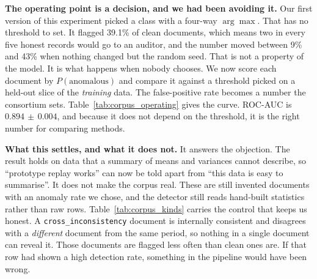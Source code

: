 \documentclass[11pt,a4paper]{article}
\begin{document}
\textbf{The operating point is a decision, and we had been avoiding it.} Our
first version of this experiment picked a class with a four-way $\arg\max$. That
has no threshold to set. It flagged 39.1\% of clean documents, which means two in
every five honest records would go to an auditor, and the number moved between
9\% and 43\% when nothing changed but the random seed. That is not a property of
the model. It is what happens when nobody chooses. We now score each document by
$P(\text{anomalous})$ and compare it against a threshold picked on a held-out
slice of the \emph{training} data. The false-positive rate becomes a number the
consortium sets. Table~\ref{tab:corpus_operating} gives the curve. ROC-AUC is
$0.894\,\pm\,0.004$, and because it does not depend on the threshold, it is the
right number for comparing methods.

\textbf{What this settles, and what it does not.} It answers the objection. The
result holds on data that a summary of means and variances cannot describe, so
``prototype replay works'' can now be told apart from ``this data is easy to
summarise''. It does not make the corpus real. These are still invented documents
with an anomaly rate we chose, and the detector still reads hand-built statistics
rather than raw rows. Table~\ref{tab:corpus_kinds} carries the control that keeps
us honest. A \texttt{cross\_inconsistency} document is internally consistent and
disagrees with a \emph{different} document from the same period, so nothing in a
single document can reveal it. Those documents are flagged less often than clean
ones are. If that row had shown a high detection rate, something in the pipeline
would have been wrong.
\end{document}
